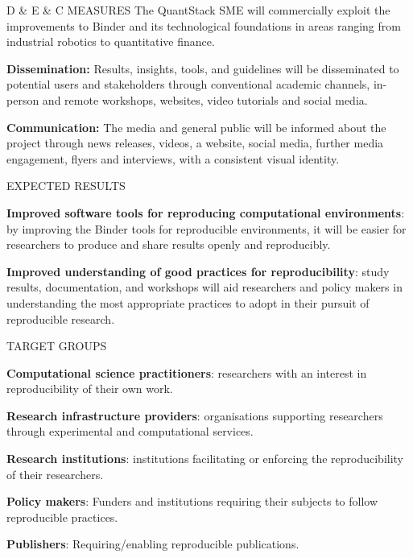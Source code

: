 \begin{multicols}{2}
\begin{summarybox}{D \& E \& C MEASURES}
The QuantStack SME will commercially exploit the improvements to Binder and its technological foundations in areas ranging from
industrial robotics to quantitative finance.

\textbf{Dissemination:} Results, insights, tools, and guidelines will
  be disseminated to potential users and stakeholders through conventional
  academic channels, in-person and remote workshops, websites, video tutorials
  and social media.

\textbf{Communication:} The media and general public will be informed
  about the project through news releases, videos, a website, social media,
  further media engagement, flyers and interviews, with a consistent visual
  identity.
\end{summarybox}

\begin{summarybox}{EXPECTED RESULTS}

\textbf{Improved software tools for reproducing computational environments}:
by improving the Binder tools for reproducible environments,
it will be easier for researchers to produce and share results openly and reproducibly.

\textbf{Improved understanding of good practices for reproducibility}: study results, documentation, and workshops will aid researchers and policy makers in understanding the most appropriate practices to adopt in their pursuit of reproducible research.

\end{summarybox}

\begin{summarybox}{TARGET GROUPS}

\textbf{Computational science practitioners}: researchers with an interest in reproducibility of their own work.

\textbf{Research infrastructure providers}: organisations supporting researchers
through experimental and computational services.

\textbf{Research institutions}: institutions facilitating or enforcing the reproducibility of their researchers.

\textbf{Policy makers}: Funders and institutions requiring their subjects to follow reproducible practices.

\textbf{Publishers}: Requiring/enabling reproducible publications.
\end{summarybox}


\end{multicols}
